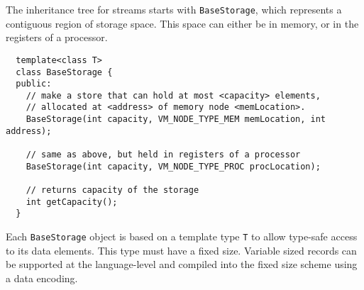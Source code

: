 

The inheritance tree for streams starts with {\tt BaseStorage}, which
represents a contiguous region of storage space.  This space can
either be in memory, or in the registers of a processor.  {\small
\begin{verbatim}
  template<class T>
  class BaseStorage {
  public:
    // make a store that can hold at most <capacity> elements,
    // allocated at <address> of memory node <memLocation>.
    BaseStorage(int capacity, VM_NODE_TYPE_MEM memLocation, int address);

    // same as above, but held in registers of a processor
    BaseStorage(int capacity, VM_NODE_TYPE_PROC procLocation);

    // returns capacity of the storage
    int getCapacity();
  }
\end{verbatim}}

Each {\tt BaseStorage} object is based on a template type {\tt T} to
allow type-safe access to its data elements.  This type must have a
fixed size.  Variable sized records can be supported at the
language-level and compiled into the fixed size scheme using a data
encoding.


\clearpage


